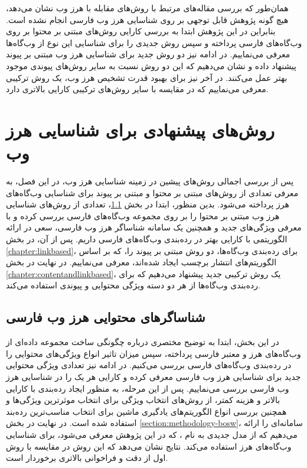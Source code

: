 \documentclass[twoside, a4paper,11pt]{book}
\numberwithin{equation}{chapter}
\numberwithin{table}{chapter}
\numberwithin{figure}{chapter}
\numberwithin{equation}{chapter}
\begin{document}
همان‌طور که بررسی مقاله‌های مرتبط با روش‌های مقابله با هرز وب نشان می‌دهد، هیچ ‌گونه پژوهش قابل توجهی بر روی شناسایی هرز وب فارسی انجام نشده است. بنابراین در این پژوهش ابتدا به بررسی کارایی روش‌های مبتنی بر محتوا بر روی وب‌گاه‌های فارسی پرداخته و سپس روش جدیدی را برای شناسایی این نوع از وب‌گاه‌ها معرفی می‌نماییم. در ادامه نیز دو روش جدید برای شناسایی هرز وب مبتنی بر پیوند پیشنهاد داده و نشان می‌دهیم که این دو روش نسبت به سایر روش‌های پیوندی موجود بهتر عمل می‌کنند. در آخر نیز برای بهبود قدرت تشخیص هرز وب، یک روش ترکیبی معرفی می‌نماییم که در مقایسه با سایر روش‌های ترکیبی کارایی بالاتری دارد. 
\chapter{روش‌های پیشنهادی برای شناسایی هرز وب}
\label{chapter:methodology}
\thispagestyle{plain}
پس از بررسی اجمالی روش‌های پیشین در زمینه شناسایی هرز وب، در این فصل، به معرفی تعدادی از روش‌های مبتنی بر محتوا و مبتنی بر پیوند برای شناسایی وب‌گاه‌های هرز پرداخته می‌شود. بدین منظور، ابتدا در بخش \ref{chapter:contentbased}، تعدادی از روش‌های شناسایی هرز وب مبتنی بر محتوا را بر روی مجموعه وب‌گاه‌های فارسی بررسی کرده و با معرفی ویژگی‌های جدید و همچنین یک سامانه شناساگر هرز وب فارسی، سعی در ارائه الگوریتمی با کارایی بهتر در رده‌بندی وب‌گاه‌های فارسی داریم. پس از آن، در بخش \ref{chapter:ٍlinkbased}، برای رده‌بندی وب‌گاه‌ها، دو روش مبتنی بر پیوند را، که بر اساس الگوریتم‌های انتشار برچسب ایجاد شده‌اند، معرفی می‌نماییم. در نهایت در بخش \ref{chapter:ٍcontentandlinkbased}، یک روش ترکیبی جدید پیشنهاد می‌دهیم که برای رده‌بندی وب‌گاه‌ها از هر دو دسته ویژگی محتوایی و پیوندی استفاده می‌کند.

\section{شناساگرهای محتوایی هرز وب فارسی}
\label{chapter:contentbased}
در این بخش، ابتدا به توضیح مختصری درباره چگونگی ساخت مجموعه داده‌ای از وب‌گاه‌های هرز و معتبر فارسی پرداخته، سپس میزان تاثیر انواع ویژگی‌های محتوایی را در رده‌بندی وب‌گاه‌های فارسی بررسی می‌کنیم. در ادامه نیز تعدادی ویژگی محتوایی جدید برای شناسایی هرز وب فارسی معرفی کرده و کارایی هر یک را در شناسایی هرز وب فارسی بررسی می‌نماییم. پس از این مرحله، به منظور ایجاد رده‌بندی با کارایی بالاتر و هزینه کمتر، از روش‌های انتخاب ویژگی برای انتخاب موثرترین ویژگی‌ها و همچنین بررسی انواع الگوریتم‌های یادگیری ماشین برای انتخاب مناسب‌ترین رده‌بند استفاده شده است. در نهایت در بخش \ref{section:methodology-bosw}، سامانه‌ای را ارائه می‌دهیم که از مدل جدیدی به نام ، که در این پژوهش معرفی می‌شود، برای شناسایی وب‌گاه‌های هرز استفاده می‌کند. نتایج نشان می‌دهد که این روش در مقایسه با روش‌ اول از دقت و فراخوانی بالاتری برخوردار است.
\end{document}
